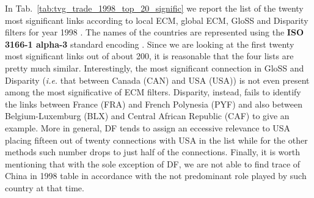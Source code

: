 \documentclass[aps,twocolumn,superscriptaddress]{revtex4-1}
\newcommand{\ie}{\emph{i.e.} }
\newcommand{\gloss}{GloSS }
\begin{document}
In Tab.~\ref{tab:tvg_trade_1998_top_20_signific} we report the list of the twenty most significant links according to local ECM, global ECM, \gloss and Disparity filters for year 1998 \cite{radicchi-pre-2011}. The names of the countries are represented using the \textbf{ISO 3166-1 alpha-3} standard encoding \cite{iso3-nations-wikipedia}. Since we are looking at the first twenty most significant links out of about 200, it is reasonable that the four lists are pretty much similar. Interestingly, the most significant connection in \gloss and Disparity (\ie that between Canada (CAN) and USA (USA)) is not even present among the most significative of ECM filters. Disparity, instead, fails to identify the links between France (FRA) and French Polynesia (PYF) and also between Belgium-Luxemburg (BLX) and Central African Republic (CAF) to give an example. More in general, DF tends to assign an eccessive relevance to USA placing fifteen out of twenty connections with USA in the list while for the other methods such number drops to just half of the connections. Finally, it is worth mentioning that with the sole exception of DF, we are not able to find trace of China in 1998 table in accordance with the not predominant role played by such country at that time.
% 
%
%
%
\end{document}
